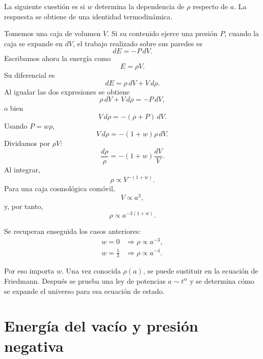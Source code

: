 La siguiente cuestión es si \(w\) determina la dependencia de \(\rho\) respecto de \(a\). La respuesta se obtiene de una identidad termodinámica.

Tomemos una caja de volumen \(V\). Si su contenido ejerce una presión \(P\), cuando la caja se expande en \(dV\), el trabajo realizado sobre sus paredes es
\begin{equation}
dE=-P\,dV.
\end{equation}
Escribamos ahora la energía como
\begin{equation}
E=\rho V.
\end{equation}
Su diferencial es
\begin{equation}
dE=\rho\,dV+V\,d\rho .
\end{equation}
Al igualar las dos expresiones se obtiene
\begin{equation}
\rho\,dV+V\,d\rho=-P\,dV,
\end{equation}
o bien
\begin{equation}
V\,d\rho=-(\rho+P)\,dV.
\end{equation}
Usando \(P=w\rho\),
\begin{equation}
V\,d\rho=-(1+w)\rho\,dV.
\end{equation}
Dividamos por \(\rho V\):
\begin{equation}
\frac{d\rho}{\rho}=-(1+w)\frac{dV}{V}.
\end{equation}
Al integrar,
\begin{equation}
\rho \propto V^{-(1+w)}.
\end{equation}
Para una caja cosmológica comóvil,
\begin{equation}
V\propto a^3,
\end{equation}
y, por tanto,
\begin{equation}
\rho \propto a^{-3(1+w)}.
\end{equation}

Se recuperan enseguida los casos anteriores:
\begin{align}
w=0 &\Longrightarrow \rho \propto a^{-3},\\
w=\frac{1}{3} &\Longrightarrow \rho \propto a^{-4}.
\end{align}

Por eso importa \(w\). Una vez conocida \(\rho(a)\), se puede sustituir en la ecuación de Friedmann. Después se prueba una ley de potencias \(a\sim t^\alpha\) y se determina cómo se expande el universo para esa ecuación de estado.

\section{Energía del vacío y presión negativa}

